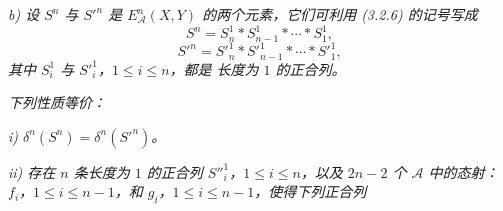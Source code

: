 \noindent\textit{b) 设 $S^n$ 与 ${S'}^n$ 是
$E_{\mathcal A}^{n}(X,Y)$ 的两个元素，它们可利用 (3.2.6) 的记号写成}
\[
S^n=S_n^1*S_{n-1}^1*\cdots*S_1^1,
\]
\[
{S'}^n={S'}_n^1*{S'}_{n-1}^1*\cdots*{S'}_1^1,
\]
\noindent\textit{其中 $S_i^1$ 与 ${S'}_i^1$，$1\leq i\leq n$，都是
长度为 $1$ 的正合列。}

\noindent\textit{下列性质等价：}

\noindent\textit{i) $\delta^n(S^n)=\delta^n({S'}^n)$。}

\noindent\textit{ii) 存在 $n$ 条长度为 $1$ 的正合列
${S''}_i^1$，$1\leq i\leq n$，以及 $2n-2$ 个 $\mathcal A$ 中的态射：
$f_i$，$1\leq i\leq n-1$，和 $g_i$，$1\leq i\leq n-1$，使得下列正合列}
\endgroup
